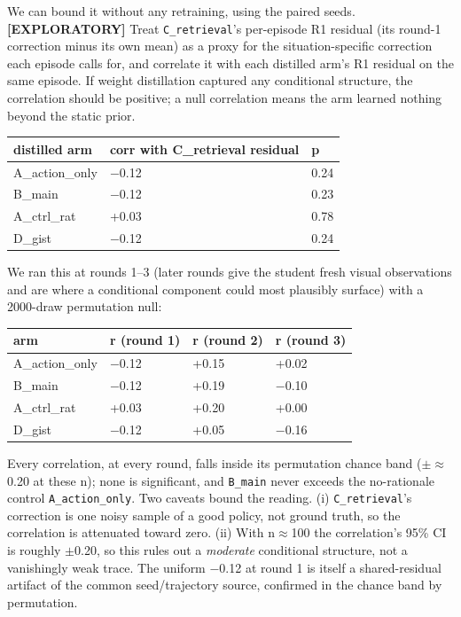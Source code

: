 We can bound it without any retraining, using the paired seeds.
\textbf{[EXPLORATORY]} Treat \texttt{C\_retrieval}'s per-episode R1 residual (its
round-1 correction minus its own mean) as a proxy for the
situation-specific correction each episode calls for, and correlate it
with each distilled arm's R1 residual on the same episode. If weight
distillation captured any conditional structure, the correlation should
be positive; a null correlation means the arm learned nothing beyond
the static prior.

\begin{table}[h]
\centering
\begin{tabular}{l l l}
\toprule
distilled arm & corr with C\_retrieval residual & p \\
\midrule
A\_action\_only & $-$0.12 & 0.24 \\
B\_main & $-$0.12 & 0.23 \\
A\_ctrl\_rat & +0.03 & 0.78 \\
D\_gist & $-$0.12 & 0.24 \\
\bottomrule
\end{tabular}
\end{table}

We ran this at rounds 1--3 (later rounds give the student fresh visual
observations and are where a conditional component could most plausibly
surface) with a 2000-draw permutation null:

\begin{table}[h]
\centering
\begin{tabular}{l l l l}
\toprule
arm & r (round 1) & r (round 2) & r (round 3) \\
\midrule
A\_action\_only & $-$0.12 & +0.15 & +0.02 \\
B\_main & $-$0.12 & +0.19 & $-$0.10 \\
A\_ctrl\_rat & +0.03 & +0.20 & +0.00 \\
D\_gist & $-$0.12 & +0.05 & $-$0.16 \\
\bottomrule
\end{tabular}
\end{table}

Every correlation, at every round, falls inside its permutation chance
band ($\pm\approx$0.20 at these n); none is significant, and \texttt{B\_main} never
exceeds the no-rationale control \texttt{A\_action\_only}. Two caveats bound the
reading. (i) \texttt{C\_retrieval}'s correction is one noisy sample of a good
policy, not ground truth, so the correlation is attenuated toward zero.
(ii) With n$\approx$100 the correlation's 95\% CI is roughly $\pm$0.20, so this
rules out a \emph{moderate} conditional structure, not a vanishingly weak
trace. The uniform $-$0.12 at round 1 is itself a shared-residual
artifact of the common seed/trajectory source, confirmed in the
chance band by permutation.

